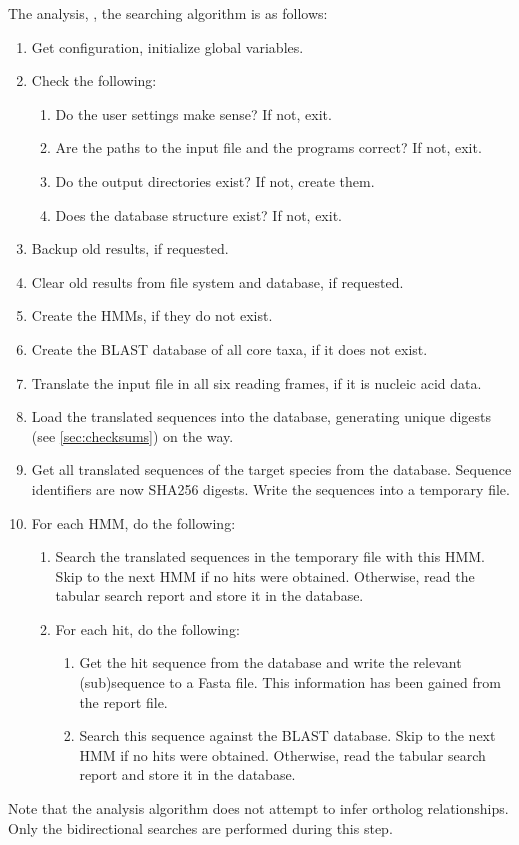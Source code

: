 The analysis, \ie, the searching algorithm is as follows:

\begin{enumerate}
	\item Get configuration, initialize global variables.
	\item Check the following:
	\begin{enumerate}
		\item Do the user settings make sense? If not, exit.
		\item Are the paths to the input file and the programs correct? If not,
			exit.
		\item Do the output directories exist? If not, create them.
		\item Does the database structure exist? If not, exit.
	\end{enumerate}
	\item Backup old results, if requested.
	\item Clear old results from file system and database, if requested.
	\item Create the HMMs, if they do not exist.
	\item Create the BLAST database of all core taxa, if it does not exist.
	\item Translate the input file in all six reading frames, if it is nucleic
		acid data.
	\item Load the translated sequences into the database, generating unique
		 digests (see
		\autoref{sec:checksums}) on the way.
	\item Get all translated sequences of the target species from the database.
		Sequence identifiers are now SHA256 digests. Write the sequences into a
		temporary file.
	\item For each HMM, do the following:
	\begin{enumerate}
		\item Search the translated sequences in the temporary file with this HMM.
			Skip to the next HMM if no hits were obtained. Otherwise, read the tabular
			search report and store it in the database. 
		\item For each hit, do the following:
		\begin{enumerate}
			\item Get the hit sequence from the database and write the relevant
				(sub)sequence to a Fasta file. This information has been gained from the
				 report file.
			\item Search this sequence against the BLAST database. Skip to the next
				HMM if no hits were obtained. Otherwise, read the tabular search report
				and store it in the database. 
		\end{enumerate}
	\end{enumerate}
\end{enumerate}

Note that the analysis algorithm does not attempt to infer ortholog
relationships. Only the bidirectional searches are performed during this step. 
